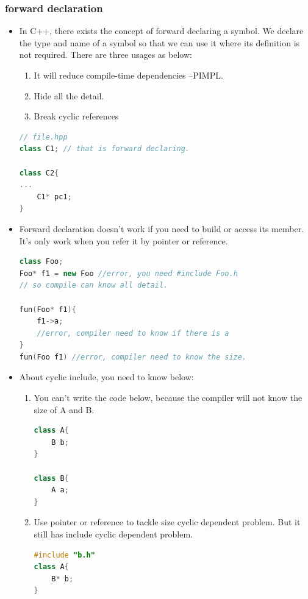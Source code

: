 \documentclass[a4paper,12pt,twoside]{book}
\begin{document}
\subsubsection{forward declaration}
\begin{itemize}
	\item In C++, there exists the concept of forward declaring a symbol. We declare the type and name of a symbol so that we can use it where its definition is not required. There are three usages as below:
	\begin{enumerate}
		\item It will reduce compile-time dependencies --PIMPL.
		\item Hide all the detail. 
		\item Break cyclic references
	\end{enumerate}
	
\begin{lstlisting}[frame=single, language=c++]
// file.hpp
class C1; // that is forward declaring.

class C2{
...
	C1* pc1;
}
\end{lstlisting}
	
	\item Forward declaration doesn't work if you need to build or access its member. It's only work when you refer it by pointer or reference.
	
\begin{lstlisting}[frame=single, language=c++]
class Foo;
Foo* f1 = new Foo //error, you need #include Foo.h
// so compile can know all detail.
	
fun(Foo* f1){
	f1->a; 
	//error, compiler need to know if there is a 
}
fun(Foo f1) //error, compiler need to know the size.
\end{lstlisting}
	
	\item About cyclic include, you need to know below:
	\begin{enumerate}
		\item You can't write the code below, because the compiler will not know the size of A and B. 
\begin{lstlisting}[frame=single, language=c++]
class A{
	B b;
}

class B{
	A a;
}
\end{lstlisting}
		\item Use pointer or reference to tackle size cyclic dependent problem. But it still has include cyclic dependent problem. 
\begin{lstlisting}[frame=single, language=c++]
#include "b.h"
class A{
	B* b;
}
		

\end{lstlisting}
\end{enumerate}
\end{itemize}
\end{document}
